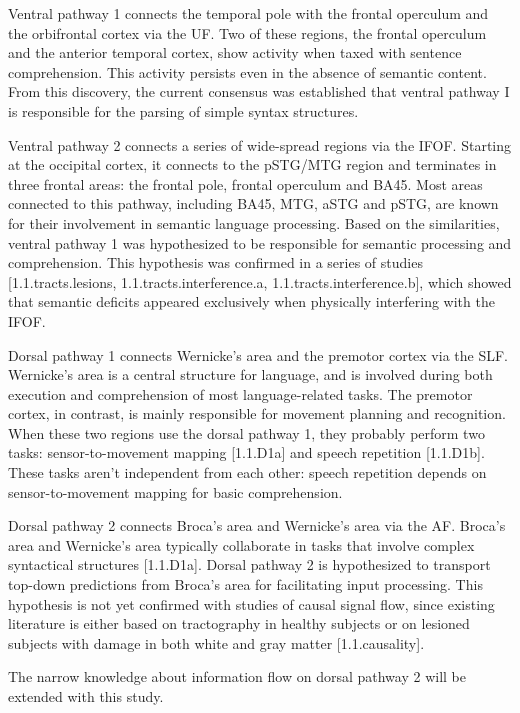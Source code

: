 Ventral pathway 1 connects the temporal pole with the frontal operculum and the orbifrontal cortex via the UF.
Two of these regions, the frontal operculum and the anterior temporal cortex, show activity when taxed with sentence comprehension.
This activity persists even in the absence of semantic content.
From this discovery, the current consensus was established that ventral pathway I is responsible for the parsing of simple syntax structures.

Ventral pathway 2 connects a series of wide-spread regions via the IFOF.
Starting at the occipital cortex, it connects to the pSTG/MTG region and terminates in three frontal areas: the frontal pole, frontal operculum and BA45.
Most areas connected to this pathway, including BA45, MTG, aSTG and pSTG, are known for their involvement in semantic language processing.
Based on the similarities, ventral pathway 1 was hypothesized to be responsible for semantic processing and comprehension.
This hypothesis was confirmed in a series of studies [1.1.tracts.lesions, 1.1.tracts.interference.a, 1.1.tracts.interference.b], which showed that semantic deficits appeared exclusively when physically interfering with the IFOF.

Dorsal pathway 1 connects Wernicke's area and the premotor cortex via the SLF.
Wernicke's area is a central structure for language, and is involved during both execution and comprehension of most language-related tasks.
The premotor cortex, in contrast, is mainly responsible for movement planning and recognition.
When these two regions use the dorsal pathway 1, they probably perform two tasks: sensor-to-movement mapping [1.1.D1a] and speech repetition [1.1.D1b].
These tasks aren't independent from each other: speech repetition depends on sensor-to-movement mapping for basic comprehension.

Dorsal pathway 2 connects Broca's area and Wernicke's area via the AF.
Broca's area and Wernicke's area typically collaborate in tasks that involve complex syntactical structures [1.1.D1a].
Dorsal pathway 2 is hypothesized to transport top-down predictions from Broca's area for facilitating input processing.
This hypothesis is not yet confirmed with studies of causal signal flow, since existing literature is either based on tractography in healthy subjects or on lesioned subjects with damage in both white and gray matter [1.1.causality].

The narrow knowledge about information flow on dorsal pathway 2 will be extended with this study.